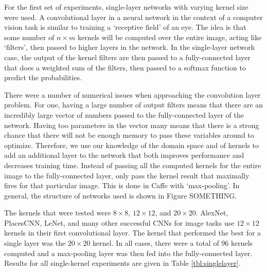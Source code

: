 \documentclass[10pt]{article}
\begin{document}
For the first set of experiments, single-layer networks with varying kernel size were used. A convolutional layer in a neural network in the context of a computer vision task is similar to training a `receptive field' of an eye. The idea is that some number of $n \times m$ kernels will be computed over the entire image, acting like `filters', then passed to higher layers in the network. In the single-layer network case, the output of the kernel filters are then passed to a fully-connected layer that does a weighted sum of the filters, then passed to a softmax function to predict the probabilities. 

There were a number of numerical issues when approaching the convolution layer problem. For one, having a large number of output filters means that there are an incredibly large vector of numbers passed to the fully-connected layer of the network. Having too parameters in the vector many means that there is a strong chance that there will not be enough memory to pass these variables around to optimize. Therefore, we use our knowledge of the domain space and of kernels to add an additional layer to the network that both improves performance and decreases training time. Instead of passing all the computed kernels for the entire image to the fully-connected layer, only pass the kernel result that maximally fires for that particular image. This is done in Caffe with `max-pooling'. In general, the structure of networks used is shown in Figure SOMETHING. 

The kernels that were tested were $8 \times 8$, $12 \times 12$, and $20 \times 20$. AlexNet, PlacesCNN, LeNet, and many other successful CNNs for image tasks use $12 \times 12$ kernels in their first convolutional layer. The kernel that performed the best for a single layer was the $20 \times 20$ kernel. In all cases, there were a total of $96$ kernels computed and a max-pooling layer was then fed into the fully-connected layer. Results for all single-kernel experiments are given in Table \ref{tbl:singlelayer}.

\begin{table}[!ht]
\centering
{}
\caption{Summary of top-1 and top-5 accuracy results on single-layer networks after 20000 iterations}
\label{tbl:singlelayer}
\end{table}
\end{document}
